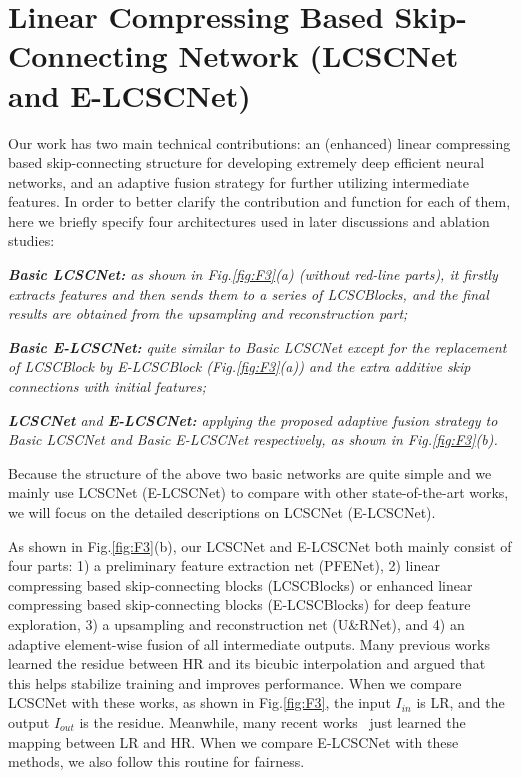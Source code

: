 \documentclass[journal]{IEEEtran}
\begin{document}
\section{Linear Compressing Based Skip-Connecting Network (LCSCNet and E-LCSCNet)}\label{s:s_3}

Our work has two main technical contributions: an (enhanced) linear compressing based skip-connecting structure for developing extremely deep efficient neural networks, and an adaptive fusion strategy for further utilizing intermediate features. In order to better clarify the contribution and function for each of them, here we briefly specify four architectures used in later discussions and ablation studies: 

\emph{\textbf{Basic LCSCNet:} as shown in Fig.\ref{fig:F3}(a) (without red-line parts), it firstly extracts features and then sends them to a series of LCSCBlocks, and the final results are obtained from the upsampling and reconstruction part;}

\emph{\textbf{Basic E-LCSCNet:} quite similar to Basic LCSCNet except for the replacement of LCSCBlock by E-LCSCBlock (Fig.\ref{fig:F3}(a)) and the extra additive skip connections with initial features;}

\emph{\textbf{LCSCNet} and \textbf{E-LCSCNet:} applying the proposed adaptive fusion strategy to Basic LCSCNet and Basic E-LCSCNet respectively, as shown in Fig.\ref{fig:F3}(b).} 

Because the structure of the above two basic networks are quite simple and we mainly use LCSCNet (E-LCSCNet) to compare with other state-of-the-art works, we will focus on the detailed descriptions on LCSCNet (E-LCSCNet).


As shown in Fig.\ref{fig:F3}(b), our LCSCNet and E-LCSCNet both mainly consist of four parts: 1) a preliminary feature extraction net (PFENet), 2) linear compressing based skip-connecting blocks (LCSCBlocks) or enhanced linear compressing based skip-connecting blocks (E-LCSCBlocks) for deep feature exploration, 3) a upsampling and reconstruction net (U\&RNet), and 4) an adaptive element-wise fusion of all intermediate outputs. Many previous works~\cite{kim2016accurate, tai2017image, Tai-MemNet-2017, LapSRN} learned the residue between HR and its bicubic interpolation and argued that this helps stabilize training and improves performance. When we compare LCSCNet with these works, as shown in Fig.\ref{fig:F3}, the input $I_{in}$ is LR, and the output $I_{out}$ is the residue. Meanwhile, many recent works~\cite{lim2017enhanced, zhang2018residual} just learned the mapping between LR and HR. When we compare E-LCSCNet with these methods, we also follow this routine for fairness. 
\end{document}

